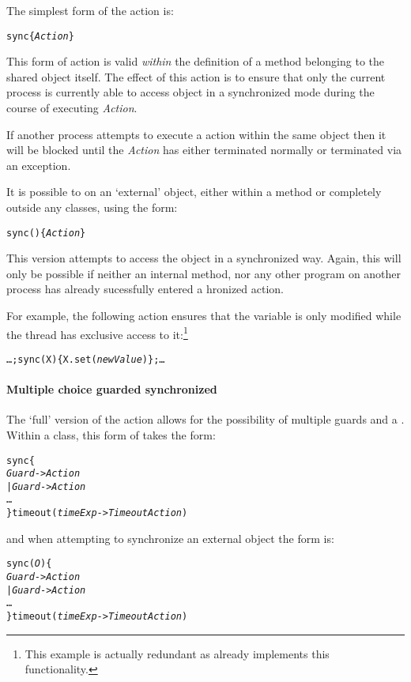 The simplest form of the  action is:
\begin{alltt}
sync\{ \emph{Action} \}
\end{alltt}
This form of action is valid \emph{within} the definition of a method belonging to the shared object itself. The effect of this action is to ensure that only the current process is currently able to access  object in a synchronized mode during the course of executing \emph{Action}.

If another process attempts to execute a  action within the same object then it will be blocked until the \emph{Action} has either terminated normally or terminated via an exception.

It is possible to  on an `external' object, either within a method or completely outside any classes, using the form:
\begin{alltt}
sync()\{ \emph{Action} \}
\end{alltt}
This version attempts to access the object  in a synchronized way. Again, this will only be possible if neither an internal method, nor any other program on another process has already sucessfully entered a hronized action.

For example, the following action ensures that the  variable  is only modified  while the thread has exclusive access to it:\footnote{This example is actually redundant as  already implements this functionality.}
\begin{alltt}
\ldots;sync(X)\{X.set(\emph{newValue})\};\ldots
\end{alltt}

\paragraph{Multiple choice guarded synchronized}
The `full' version of the  action allows for the possibility of multiple guards and a . Within a class, this form of  takes the form:
\begin{alltt}
sync\{
  \emph{Guard} -> \emph{Action}
| \emph{Guard} -> \emph{Action}
\ldots
\} timeout (\emph{timeExp} -> \emph{TimeoutAction})
\end{alltt}
and when attempting to synchronize an external object the form is:
\begin{alltt}
sync(\emph{O})\{
  \emph{Guard} -> \emph{Action}
| \emph{Guard} -> \emph{Action}
\ldots
\} timeout (\emph{timeExp} -> \emph{TimeoutAction})
\end{alltt}

